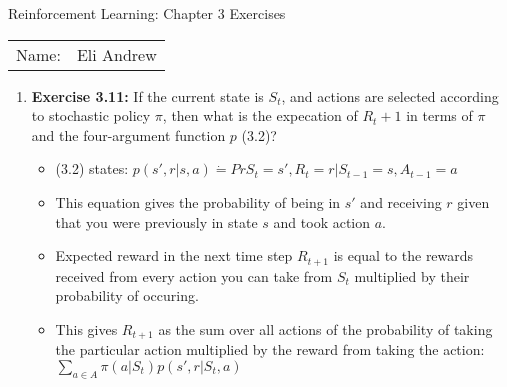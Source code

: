 \documentclass[12pt]{article}
\begin{document}
\begin{center}
{\Large Reinforcement Learning: Chapter 3 Exercises}

\begin{tabular}{rl}
Name: & Eli Andrew
\end{tabular}
\end{center}

\begin{enumerate}[label=(\alph*)]
  \item \textbf{Exercise 3.11:} If the current state is $S_t$, and actions
  are selected according to stochastic policy $\pi$, then what is the expecation
  of $R_t+1$ in terms of $\pi$ and the four-argument function $p$ (3.2)?
  \begin{itemize}
    \item (3.2) states: $p(s', r | s, a) \dot{=} Pr{S_t = s', R_t = r | S_{t-1} = s, A_{t-1} = a}$
    \item This equation gives the probability of being in $s'$ and receiving $r$ given that you were
    previously in state $s$ and took action $a$.
    \item Expected reward in the next time step $R_{t+1}$ is equal to the rewards received from every action
    you can take from $S_t$ multiplied by their probability of occuring.
    \item This gives $R_{t+1}$ as the sum over all actions of the probability of taking the particular action
    multiplied by the reward from taking the action:\\
    $\sum_{a \in A} \pi(a | S_t) p(s', r | S_t, a)$
  \end{itemize}
  
\end{enumerate}
\end{document}
